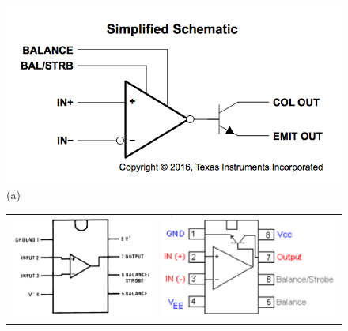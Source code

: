 \documentclass[12pt]{article}
\begin{document}
\begin{figure}[thbp]
\begin{center}
{\includegraphics[height=0.2\textheight]{figs/LM311-scheme.png}}  \\
(a) \\ \vskip 1cm
\begin{tabular}{cc}
{\includegraphics[height=0.2\textheight]{figs/LM311.png}} &
{\includegraphics[height=0.2\textheight]{figs/LM311-trans.png}} \\

\end{tabular}
\end{center}
\end{figure}
\end{document}
